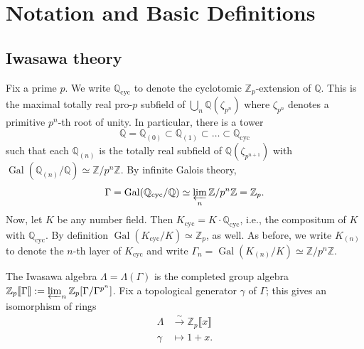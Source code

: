 \documentclass{amsart}
\numberwithin{equation}{section}
\theoremstyle{remark}
\newcommand{\Gal}{\operatorname{Gal}}
\newcommand{\Zp}{\mathbb{Z}_p}
\newcommand{\Z}{\mathbb{Z}}
\newcommand{\Q}{\mathbb{Q}}
\newcommand{\cyc}{\operatorname{{cyc}}}
\theoremstyle{plain} %
\begin{document}
\section{Notation and Basic Definitions}
\label{sec: preliminary}

\subsection{Iwasawa theory}

Fix a prime $p$.
We write $\Q_{\cyc}$ to denote the cyclotomic $\Zp$-extension of $\Q$.
This is the maximal totally real pro-$p$ subfield of $\bigcup_n \Q(\zeta_{p^n})$ where $\zeta_{p^n}$ denotes a primitive $p^n$-th root of unity.
In particular, there is a tower
\[
\Q = \Q_{(0)} \subset \Q_{(1)} \subset \ldots \subset \Q_{\cyc}
\]
such that each $\Q_{(n)}$ is the totally real subfield of $\Q(\zeta_{p^{n+1}})$ with $\Gal(\Q_{(n)}/\Q)\simeq \Z/p^n\Z$.
By infinite Galois theory,
\[
\Gamma = \Gal(\Q_{\cyc}/\Q) \simeq \varprojlim_n \Z/p^n\Z = \Zp.
\]
Now, let $K$ be any number field.
Then $K_{\cyc} = K \cdot \Q_{\cyc}$, i.e., the compositum of $K$ with $\Q_{\cyc}$.
By definition $\Gal(K_{\cyc}/K)\simeq \Zp$, as well.
As before, we write $K_{(n)}$ to denote the $n$-th layer of $K_{\cyc}$ and write $\Gamma_n = \Gal(K_{(n)}/K) \simeq \Z/p^n \Z$.

The Iwasawa algebra $\Lambda=\Lambda(\Gamma)$ is the completed group algebra $\Z_p\llbracket \Gamma \rrbracket :=\varprojlim_n \Z_p[\Gamma/\Gamma^{p^n}]$.
Fix a topological generator $\gamma$ of $\Gamma$; this gives an isomorphism of rings 
\begin{align*}
\Lambda &\xrightarrow{\sim} \Z_p\llbracket x\rrbracket \\
\gamma & \mapsto 1+x.
\end{align*}
\end{document}
